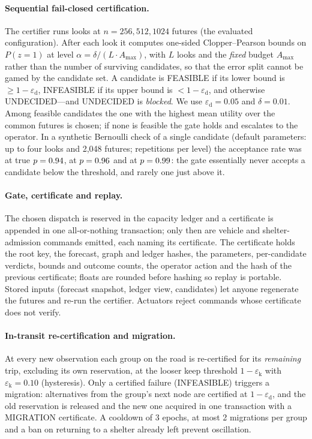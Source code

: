 \documentclass[letterpaper]{article}
\newcommand{\epsd}{\varepsilon_{\mathrm{d}}}
\newcommand{\epsk}{\varepsilon_{\mathrm{k}}}
\begin{document}
\paragraph{Sequential fail-closed certification.} The certifier runs looks at $n=256,512,1024$ futures
(the evaluated configuration). After each look it computes one-sided Clopper--Pearson bounds
\citep{clopper1934} on $P(z=1)$ at level $\alpha=\delta/(L\cdot A_{\max})$, with $L$ looks and the
\emph{fixed} budget $A_{\max}$ rather than the number of surviving candidates, so that the error split
cannot be gamed by the candidate set. A candidate is FEASIBLE if its lower bound is $\ge 1-\epsd$,
INFEASIBLE if its upper bound is $<1-\epsd$, and otherwise UNDECIDED---and UNDECIDED is \emph{blocked}.
We use $\epsd=0.05$ and $\delta=0.01$. Among feasible candidates the one with the highest mean utility over
the common futures is chosen; if none is feasible the gate holds and escalates to the operator. In a
synthetic Bernoulli check of a single candidate (default parameters: up to four looks and 2{,}048
futures; \nCovReps{} repetitions per level) the acceptance rate was \nCovAccNinetyFour{}
at true $p=0.94$, \nCovAccNinetySix{} at $p=0.96$ and \nCovAccNinetyNine{} at
$p=0.99$: the gate essentially never accepts a candidate below the threshold, and rarely one
just above it.

\paragraph{Gate, certificate and replay.} The chosen dispatch is reserved in the capacity ledger and a
certificate is appended in one all-or-nothing transaction; only then are vehicle and shelter-admission
commands emitted, each naming its certificate. The certificate holds the root key, the forecast, graph
and ledger hashes, the parameters, per-candidate verdicts, bounds and outcome counts, the operator action
and the hash of the previous certificate; floats are rounded before hashing so replay is portable.
Stored inputs (forecast snapshot, ledger view, candidates) let anyone regenerate the futures and re-run
the certifier. Actuators reject commands whose certificate does not verify.

\paragraph{In-transit re-certification and migration.} At every new observation each group on the road
is re-certified for its \emph{remaining} trip, excluding its own reservation, at the looser keep
threshold $1-\epsk$ with $\epsk=0.10$ (hysteresis). Only a certified failure (INFEASIBLE) triggers a
migration: alternatives from the group's next node are certified at $1-\epsd$, and the old reservation is
released and the new one acquired in one transaction with a MIGRATION certificate. A cooldown of 3 epochs,
at most 2 migrations per group and a ban on returning to a shelter already left prevent oscillation.
\end{document}
